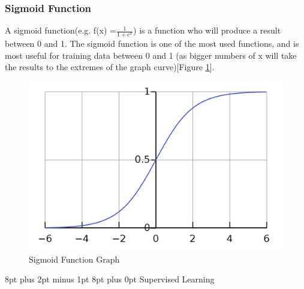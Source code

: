 \documentclass[12pt,a4paper]{article}
\makeatletter
\renewcommand\section{\@startsection {section}{1}{0mm} %
                               {8pt plus 2pt minus 1pt} %
                               {8pt plus 0pt} %
                               {\bfseries}}
\makeatother
\begin{document}
\subsubsection{Sigmoid Function}
A sigmoid function(e.g. f(x) =\( \frac{1}{1+e^x} \)) is a function who will produce a result between 0 and 1. The sigmoid function is one of the most used functions, and is most useful for training data between 0 and 1 (as bigger numbers of x will take the results to the extremes of the graph curve)[Figure \ref{fig:3}].
\begin{figure}[ht]
	\includegraphics[width=\textwidth]{sigmoid}
	\centering
	\caption{Sigmoid Function Graph \protect \cite{nikhil_ketkar_deep_2017}}
	\label{fig:3}
\end{figure}
\section {Supervised Learning}
\end{document}
